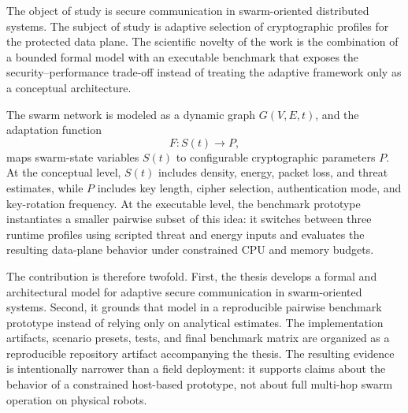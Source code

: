 The object of study is secure communication in swarm-oriented distributed systems. The subject of study is adaptive selection of cryptographic profiles for the protected data plane. The scientific novelty of the work is the combination of a bounded formal model with an executable benchmark that exposes the security--performance trade-off instead of treating the adaptive framework only as a conceptual architecture.

The swarm network is modeled as a dynamic graph $G(V,E,t)$, and the adaptation function
\begin{equation}
F : S(t) \rightarrow P,
\label{eq:adaptation_function}
\end{equation}
maps swarm-state variables $S(t)$ to configurable cryptographic parameters $P$. At the conceptual level, $S(t)$ includes density, energy, packet loss, and threat estimates, while $P$ includes key length, cipher selection, authentication mode, and key-rotation frequency. At the executable level, the benchmark prototype instantiates a smaller pairwise subset of this idea: it switches between three runtime profiles using scripted threat and energy inputs and evaluates the resulting data-plane behavior under constrained CPU and memory budgets.

The contribution is therefore twofold. First, the thesis develops a formal and architectural model for adaptive secure communication in swarm-oriented systems. Second, it grounds that model in a reproducible pairwise benchmark prototype instead of relying only on analytical estimates. The implementation artifacts, scenario presets, tests, and final benchmark matrix are organized as a reproducible repository artifact accompanying the thesis. The resulting evidence is intentionally narrower than a field deployment: it supports claims about the behavior of a constrained host-based prototype, not about full multi-hop swarm operation on physical robots.
